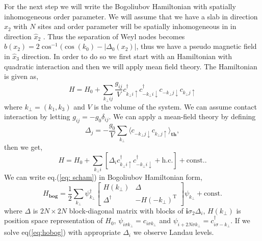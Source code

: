 \documentclass[%
 preprint,
 amsmath,amssymb,
 aps,
]{revtex4-1}
\begin{document}
For the next step we will write the Bogoliubov Hamiltonian with spatially inhomogeneous order parameter. We will assume that we have a slab in  direction $\hat{x}_2$ with $N$ sites and order parameter will be spatially inhomogeneous in in  direction $\hat{x}_2$ . Thus the separation of Weyl nodes becomes $b(x_2)=2\cos^{-1}(\cos(k_0)-|\Delta_0(x_2)|$, thus we have a pseudo magnetic field in $\hat{x}_3$ direction. In order to do so we first start with an Hamiltonian with quadratic interaction and then we will apply mean field theory. The Hamiltonian is given as,
\begin{equation}
H=H_0+\sum_{k_\perp ij}\frac{g_{ij}}{V}c^{\dagger}_{k_\perp i\uparrow}c^{\dagger}_{-k_\perp i\downarrow}c_{-k_\perp j\downarrow}c_{k_\perp j\uparrow}\label{eq:hint}
\end{equation}
where $k_{\perp}=(k_1,k_3)$ and $V$ is the volume of the system.
We can assume contact interaction by letting  $g_{ij}=-g_0\delta_{ij}$. We can apply a mean-field theory by defining 
\begin{equation}
\Delta_j=-\frac{g_0}{V}\sum_{k_\perp}\langle c_{-k_\perp j\downarrow}c_{k_\perp j\uparrow}\rangle_\textbf{th},\label{eq:scd}
\end{equation}
then we get, 
\begin{equation}
H=H_0+\sum_{k_\perp i}[\Delta_ic^{\dagger}_{k_\perp i\uparrow}c^{\dagger}_{-k_\perp i\downarrow}+\text{h.c.}] +\text{const.}\label{eq: scham}.
\end{equation}
We can write eq.(\ref{eq: scham}) in Bogoliubov Hamiltonian form,
\begin{equation}
H_{\textbf{bog}}=\frac{1}{2}\sum_{k_{\perp}}\psi^{\dagger}_{k_{\perp}}\begin{bmatrix}
    H(k_{\perp}) & \Delta \\
    \Delta^{\dagger} & -H(-k_{\perp})^{\text{T}} 
\end{bmatrix} \psi_{k_{\perp}}+\text{const.} \label{eq:hobog}
\end{equation}
where $\Delta$ is $2N\times2N$ block-diagonal matrix with blocks of $\textbf{i}\sigma_2 \Delta_i$, $H(k_{\perp})$ is position space representation of $H_0$,  $\psi_{i\sigma k_{\perp}}=c_{i\sigma k_{\perp}}$ and $\psi_{i+2N\sigma k_{\perp}}=c^{\dagger}_{i\sigma -k_{\perp}}.$ If we solve eq(\ref{eq:hobog}) with appropriate $\Delta_i$ we observe Landau levels. 
\end{document}
